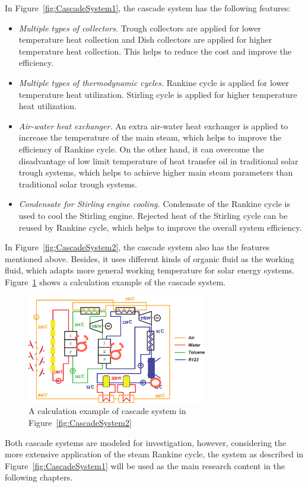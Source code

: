 In Figure~\ref{fig:CascadeSystem1}, the cascade system has the following features:

\begin{itemize}
  \item \emph{Multiple types of collectors.} Trough collectors are applied for lower temperature heat collection and Dish collectors are applied for higher temperature heat collection. This helps to reduce the cost and improve the efficiency.
  \item \emph{Multiple types of thermodynamic cycles.} Rankine cycle is applied for lower temperature heat utilization. Stirling cycle is applied for higher temperature heat utilization.
  \item \emph{Air-water heat exchanger.} An extra air-water heat exchanger is applied to increase the temperature of the main steam, which helps to improve the efficiency of Rankine cycle. On the other hand, it can overcome the disadvantage of low limit temperature of heat transfer oil in traditional solar trough systems, which helps to achieve higher main steam parameters than traditional solar trough systems. 
  \item \emph{Condensate for Stirling engine cooling.} Condensate of the Rankine cycle is used to cool the Stirling engine. Rejected heat of the Stirling cycle can be reused by Rankine cycle, which helps to improve the overall system efficiency.
\end{itemize}

In Figure~\ref{fig:CascadeSystem2}, the cascade system also has the features mentioned above. Besides, it uses different kinds of organic fluid as the working fluid, which adapts more general working temperature for solar energy systems. Figure~\ref{fig:Ex_CascadeSystem2} shows a calculation example of the cascade system.

\begin{figure}[!ht]
\centering 
\includegraphics[width=0.7\textwidth]{fig/Ex_CascadeSystem2}
\caption{A calculation example of cascade system in Figure~\ref{fig:CascadeSystem2}}
\label{fig:Ex_CascadeSystem2}
\end{figure}

Both cascade systems are modeled for investigation, however, considering the more extensive application of the steam Rankine cycle, the system as described in Figure~\ref{fig:CascadeSystem1} will be used as the main research content in the following chapters.
